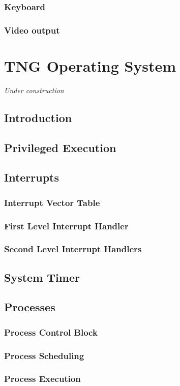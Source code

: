 \documentclass{book}
\begin{document}
\subsection{Keyboard}
\subsection{Video output}

\chapter{TNG Operating System}
\textit{Under construction}

\section{Introduction}
\section{Privileged Execution}
\section{Interrupts}
\subsection{Interrupt Vector Table}
\subsection{First Level Interrupt Handler}
\subsection{Second Level Interrupt Handlers}
\section{System Timer}
\section{Processes}
\subsection{Process Control Block}
\subsection{Process Scheduling}
\subsection{Process Execution}
\end{document}
